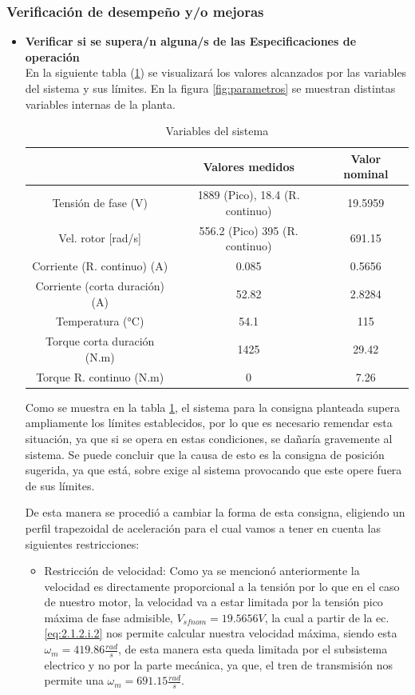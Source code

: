 \documentclass[10pt]{article}
\begin{document}
\subsubsection{Verificación de desempeño y/o mejoras}
\begin{itemize}
	\item \textbf{Verificar si se supera/n alguna/s de las Especificaciones de operación}\\
	En la siguiente tabla (\ref{tab:4}) se visualizará los valores alcanzados por las variables del sistema y sus límites. En la figura \ref{fig:parametros} se muestran distintas variables internas de la planta.
	\begin{table}[h!]
		\begin{center}
		\begin{tabular}{| c | c | c | }
		\hline
		  & Valores medidos & Valor nominal  \\ \hline
		 Tensión de fase (V) & 1889 (Pico), 18.4 (R. continuo) & 19.5959\\ \hline
		 Vel. rotor [rad/s]& 556.2 (Pico) 395 (R. continuo)&  691.15\\ \hline
		Corriente (R. continuo) (A) &0.085 & 0.5656\\ \hline
		Corriente (corta duración) (A) &52.82 &2.8284\\ \hline
		Temperatura (°C) &54.1 & 115\\ \hline
		Torque corta duración (N.m) & 1425 & 29.42\\ \hline
		Torque R. continuo (N.m) & 0 & 7.26\\ \hline
		\end{tabular}
		\caption{Variables del sistema}
		\label{tab:4}
		\end{center}
		\end{table}



Como se muestra en la tabla \ref{tab:4}, el sistema para la consigna planteada supera ampliamente los límites establecidos, por lo que es necesario remendar esta situación, ya que si se opera en estas condiciones, se dañaría gravemente al sistema.
Se puede concluir que la causa de esto es la consigna de posición sugerida, ya que está, sobre exige al sistema provocando que este opere fuera de sus límites.

 De esta manera se procedió a cambiar la forma de esta consigna, eligiendo un perfil trapezoidal de aceleración para el cual vamos a tener en cuenta las siguientes restricciones:

\begin{itemize}
	 \item Restricción de velocidad: Como ya se mencionó anteriormente la velocidad es directamente proporcional a la tensión por lo que en el caso de nuestro motor, la velocidad
	 va a estar limitada por la tensión pico máxima de fase admisible, \textbf{$V_{sfnom}=19.5656 V$}, la cual a partir de la ec.\ref{eq:2.1.2.i.2} nos permite calcular nuestra velocidad
	 máxima, siendo esta $\omega_{m}=419.86\frac{rad}{s}$, de esta manera esta queda limitada por el subsistema electrico y no por la parte mecánica, ya que, el tren de transmisión nos 
	 permite una $\omega_{m}=691.15\frac{rad}{s}$.


\end{itemize}
\end{itemize}
\end{document}
